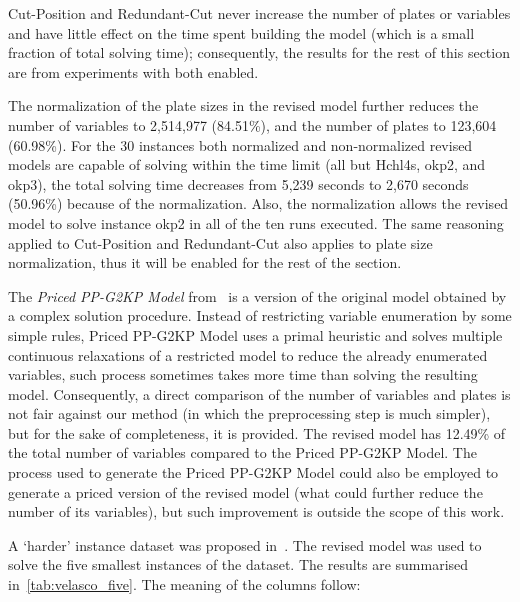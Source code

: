 \documentclass[runningheads]{llncs}
\begin{document}
Cut-Position and Redundant-Cut never increase the number of plates or variables and have little effect on the time spent building the model (which is a small fraction of total solving time); consequently, the results for the rest of this section are from experiments with both enabled.

The normalization of the plate sizes in the revised model further reduces the number of variables to 2,514,977 (84.51\%), and the number of plates to 123,604 (60.98\%).
For the 30 instances both normalized and non-normalized revised models are capable of solving within the time limit (all but Hchl4s, okp2, and okp3), the total solving time decreases from 5,239 seconds to 2,670 seconds (50.96\%) because of the normalization.
Also, the normalization allows the revised model to solve instance okp2 in all of the ten runs executed.
The same reasoning applied to Cut-Position and Redundant-Cut also applies to plate size normalization, thus it will be enabled for the rest of the section.

The \emph{Priced PP-G2KP Model} from~\cite{furini:2016} is a version of the original model obtained by a complex solution procedure.
Instead of restricting variable enumeration by some simple rules, Priced PP-G2KP Model uses a primal heuristic and solves multiple continuous relaxations of a restricted model to reduce the already enumerated variables, such process sometimes takes more time than solving the resulting model.
Consequently, a direct comparison of the number of variables and plates is not fair against our method (in which the preprocessing step is much simpler), but for the sake of completeness, it is provided.
The revised model has 12.49\% of the total number of variables compared to the Priced PP-G2KP Model.
The process used to generate the Priced PP-G2KP Model could also be employed to generate a priced version of the revised model (what could further reduce the number of its variables), but such improvement is outside the scope of this work.

A `harder' instance dataset was proposed in~\cite{velasco:2019}.
The revised model was used to solve the five smallest instances of the dataset.
The results are summarised in~\autoref{tab:velasco_five}. The meaning of the columns follow:
\end{document}

